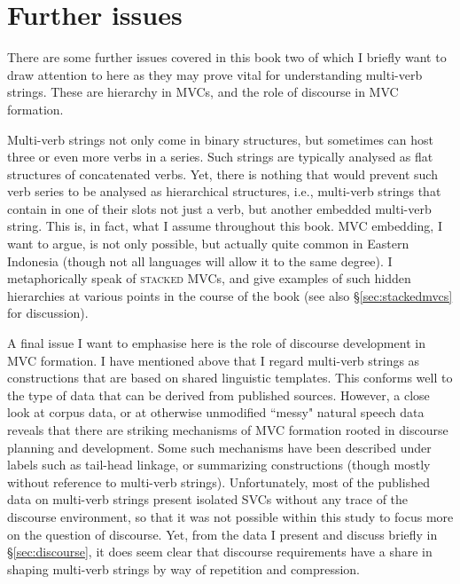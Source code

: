 \section*{Further issues}

There are some further issues covered in this book two of which I briefly want to draw attention to here as they may prove vital for understanding multi-verb strings. These are hierarchy in MVCs, and the role of discourse in MVC formation.

Multi-verb strings not only come in binary structures, but sometimes can host three or even more verbs in a series. Such strings are typically analysed as flat structures of concatenated verbs. Yet, there is nothing that would prevent such verb series to be analysed as hierarchical structures, i.e., multi-verb strings that contain in one of their slots not just a verb, but another embedded multi-verb string. This is, in fact, what I assume throughout this book. MVC embedding, I want to argue, is not only possible, but actually quite common in Eastern Indonesia (though not all languages will allow it to the same degree). I metaphorically speak of \textsc{stacked MVC}s, and give examples of such hidden hierarchies at various points in the course of the book (see also §\ref{sec:stackedmvcs} for discussion).

A final issue I want to emphasise here is the role of discourse development in MVC formation. I have mentioned above that I regard multi-verb strings as constructions that are based on shared linguistic templates. This conforms well to the type of data that can be derived from published sources. However, a close look at corpus data, or at otherwise unmodified ``messy" natural speech data reveals that there are striking mechanisms of MVC formation rooted in discourse planning and development. Some such mechanisms have been described under labels such as tail-head linkage, or summarizing constructions (though mostly without  reference to multi-verb strings). Unfortunately, most of the published data on multi-verb strings present isolated SVCs without any trace of the discourse environment, so that it was not possible within this study to focus more on the question of discourse. Yet, from the data I present and discuss briefly in §\ref{sec:discourse}, it does seem clear that discourse requirements have a share in shaping multi-verb strings by way of repetition and compression.
